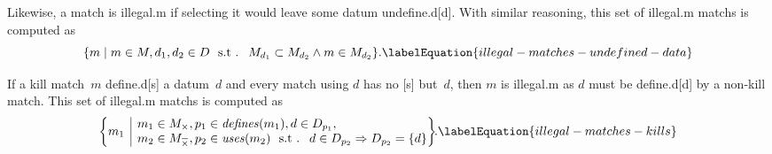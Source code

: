 Likewise, a \gls{match} is \gls{illegal.m} if selecting it would
leave some \gls{datum} un\gls{define.d}[d].
%
With similar reasoning, this set of \gls{illegal.m} \glspl{match} is computed as
%
\begin{equation}
  \mSetBuilder{m}%
              {
                m \in \mMatchSet,
                d_1, d_2 \in \mDataSet
                \text{ \st }
                \mMatchSet[d_1] \subset \mMatchSet[d_2]
                \mAnd
                m \in \mMatchSet[d_2]
              }.
  \labelEquation{illegal-matches-undefined-data}
\end{equation}

If a \gls{kill match}~$m$ \gls{define.d}[s] a \gls{datum}~$d$ and every
\gls{match} using $d$ has no [s]
but~$d$\hspace{-.8pt}, then $m$ is \gls{illegal.m} as $d$ must be
\gls{define.d}[d] by a non-\gls{kill match}.
%
This set of \gls{illegal.m} \glspl{match} is computed as
%
\begin{equation}
  \mSetBuilder*{m_1}%
               {%
                 \begin{array}{@{}l@{}}
                   m_1 \in \mKillMatchSet,
                   p_1 \in \mDefines(m_1),
                   d \in \mDataSet[p_1], \\
                   m_2 \in \mKillMatchCompSet,
                   p_2 \in \mUses(m_2) \text{ \st }
                   d \in \mDataSet[p_2] \mImp \mDataSet[p_2] = \mSet{d}
                 \end{array}
               }\!\!.
  \labelEquation{illegal-matches-kills}
\end{equation}

